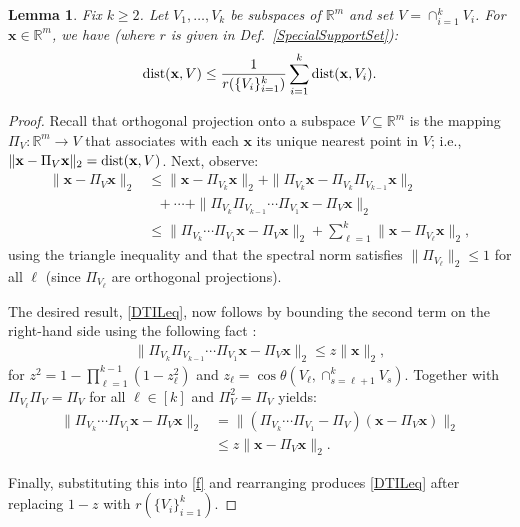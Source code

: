 \documentclass[9pt,twocolumn]{pnas-new}
\newtheorem{lemma}{Lemma}
\begin{document}
\begin{lemma}\label{DistanceToIntersectionLemma}
Fix $k \geq 2$. Let $V_1, \ldots, V_k$ be subspaces of $\mathbb{R}^m$ and set $V = \cap_{i = 1}^k V_i$. For  $\mathbf{x} \in \mathbb{R}^m$, we have (where $r$ is given in Def.~\ref{SpecialSupportSet}):
\begin{align}\label{DTILeq}
\text{\rm dist}(\mathbf{x}, V) \leq \frac{1}{r(\{V_i\}_{i = 1}^k)} \sum_{i=1}^k \text{\rm dist}(\mathbf{x}, V_i).
\end{align}
\end{lemma}
\begin{proof} 
Recall that orthogonal projection onto a subspace $V \subseteq \mathbb{R}^m$ is the mapping $\Pi_V: \mathbb{R}^m \to V$ that associates with each $\mathbf{x}$ its unique nearest point in $V$; i.e., $\|\mathbf{x} - \Pi_V\mathbf{x}\|_2 = \text{\rm dist}(\mathbf{x}, V)$.
Next, observe:
\begin{align}\label{f}
\|\mathbf{x} - \Pi_V\mathbf{x}\|_2 &\leq \|\mathbf{x} - \Pi_{V_k} \mathbf{x}\|_2 + \|\Pi_{V_k}  \mathbf{x} - \Pi_{V_k}\Pi_{V_{k-1}}\mathbf{x}\|_2 \nonumber \\
&\ \ \ + \cdots + \|\Pi_{V_k} \Pi_{V_{k-1}}\cdots \Pi_{V_1} \mathbf{x} - \Pi_V \mathbf{x}\|_2 \nonumber \\
&\leq \|\Pi_{V_k}\cdots\Pi_{V_{1}} \mathbf{x} - \Pi_V \mathbf{x}\|_2 + \sum_{\ell=1}^k \|\mathbf{x} - \Pi_{V_{\ell}} \mathbf{x}\|_2,
\end{align}
%
using the triangle inequality and that the spectral norm satisfies $\|\Pi_{V_{\ell}}\|_2 \leq 1$ for all $\ell$ (since $\Pi_{V_{\ell}}$ are orthogonal projections).

The desired result, \eqref{DTILeq}, now follows by bounding the second term on the right-hand side using the following fact \cite[Thm.~9.33]{Deutsch12}:
\begin{align}
\|\Pi_{V_k}\Pi_{V_{k-1}}\cdots\Pi_{V_1} \mathbf{x} - \Pi_V\mathbf{x}\|_2 \leq z \|\mathbf{x}\|_2, %
\end{align}
for \mbox{$z^2= 1 - \prod_{\ell =1}^{k-1}(1-z_{\ell}^2)$} and \mbox{$z_{\ell} = \cos\theta\left(V_{\ell}, \cap_{s=\ell+1}^k V_s\right)$}. Together with $\Pi_{V_\ell} \Pi_V = \Pi_V$ for all $\ell \in [k]$ and $\Pi_V^2 = \Pi_V$ yields:
\begin{align*}
\|\Pi_{V_k} \cdots \Pi_{V_1}\mathbf{x}  - \Pi_V \mathbf{x} \|_2 
&= \|\left( \Pi_{V_k} \cdots\Pi_{V_1} - \Pi_V \right) (\mathbf{x} - \Pi_V\mathbf{x})\|_2 \\
&\leq z\|\mathbf{x} - \Pi_V\mathbf{x}\|_2.
\end{align*}

Finally, substituting this into \eqref{f} and rearranging produces \eqref{DTILeq} after replacing $1 - z$ with $r(\{V_i\}_{i=1}^k)$.
\end{proof}
\end{document}
